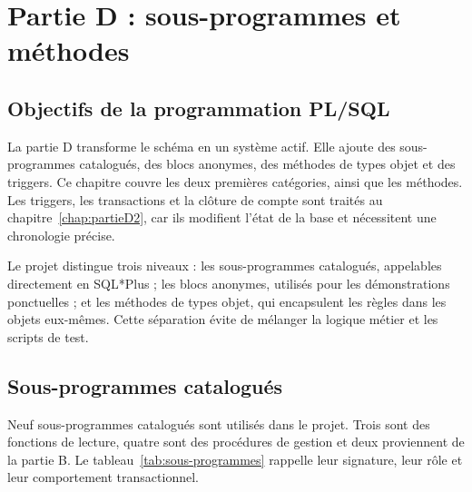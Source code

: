 \chapter{Partie D : sous-programmes et méthodes}
\label{chap:partieD1}

\section{Objectifs de la programmation PL/SQL}

La partie D transforme le schéma en un système actif. Elle ajoute des
sous-programmes catalogués, des blocs anonymes, des méthodes de types objet et
des triggers. Ce chapitre couvre les deux premières catégories, ainsi que les
méthodes. Les triggers, les transactions et la clôture de compte sont traités
au chapitre~\ref{chap:partieD2}, car ils modifient l'état de la base et
nécessitent une chronologie précise.

\begin{objectifbox}
Le projet distingue trois niveaux : les sous-programmes catalogués, appelables
directement en SQL*Plus ; les blocs anonymes, utilisés pour les démonstrations
ponctuelles ; et les méthodes de types objet, qui encapsulent les règles dans
les objets eux-mêmes. Cette séparation évite de mélanger la logique métier et
les scripts de test.
\end{objectifbox}

\section{Sous-programmes catalogués}

Neuf sous-programmes catalogués sont utilisés dans le projet. Trois sont des
fonctions de lecture, quatre sont des procédures de gestion et deux proviennent
de la partie B. Le tableau~\ref{tab:sous-programmes} rappelle leur signature,
leur rôle et leur comportement transactionnel.

